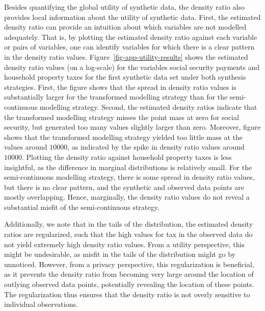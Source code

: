 \documentclass[
]{article}
\begin{document}
Besides quantifying the global utility of synthetic data, the density
ratio also provides local information about the utility of synthetic
data. First, the estimated density ratio can provide an intuition about
which variables are not modelled adequately. That is, by plotting the
estimated density ratio against each variable or pairs of variables, one
can identify variables for which there is a clear pattern in the density
ratio values. Figure~\ref{fig-app-utility-results} shows the estimated
density ratio values (on a log-scale) for the variables social security
payments and household property taxes for the first synthetic data set
under both synthesis strategies. First, the figure shows that the spread
in density ratio values is substantially larger for the transformed
modelling strategy than for the semi-continuous modelling strategy.
Second, the estimated density ratios indicate that the transformed
modelling strategy misses the point mass at zero for social security,
but generated too many values slightly larger than zero. Moreover,
figure shows that the transformed modelling strategy yielded too little
mass at the values around \(10000\), as indicated by the spike in
density ratio values around \(10000\). Plotting the density ratio
against household property taxes is less insightful, as the difference
in marginal distributions is relatively small. For the semi-continuous
modelling strategy, there is some spread in density ratio values, but
there is no clear pattern, and the synthetic and observed data points
are mostly overlapping. Hence, marginally, the density ratio values do
not reveal a substantial misfit of the semi-continuous strategy.

Additionally, we note that in the tails of the distribution, the
estimated density ratios are regularized, such that the high values for
tax in the observed data do not yield extremely high density ratio
values. From a utility perspective, this might be undesirable, as misfit
in the tails of the distribution might go by unnoticed. However, from a
privacy perspective, this regularization is beneficial, as it prevents
the density ratio from becoming very large around the location of
outlying observed data points, potentially revealing the location of
these points. The regularization thus ensures that the density ratio is
not overly sensitive to individual observations.
\end{document}

